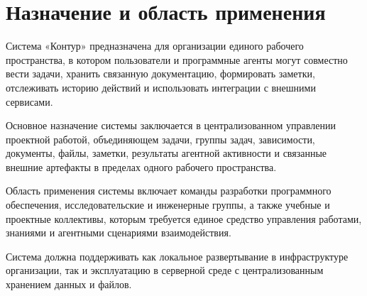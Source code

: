 \section{Назначение и область применения}

\headingtextsep

Система «Контур» предназначена для организации единого рабочего пространства, в котором пользователи и программные агенты могут совместно вести задачи, хранить связанную документацию, формировать заметки, отслеживать историю действий и использовать интеграции с внешними сервисами.

Основное назначение системы заключается в централизованном управлении проектной работой, объединяющем задачи, группы задач, зависимости, документы, файлы, заметки, результаты агентной активности и связанные внешние артефакты в пределах одного рабочего пространства.

Область применения системы включает команды разработки программного обеспечения, исследовательские и инженерные группы, а также учебные и проектные коллективы, которым требуется единое средство управления работами, знаниями и агентными сценариями взаимодействия.

Система должна поддерживать как локальное развертывание в инфраструктуре организации, так и эксплуатацию в серверной среде с централизованным хранением данных и файлов.